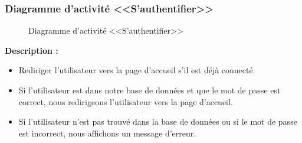 \documentclass[12pt]{report}
\begin{document}
\newpage

\subsubsection{Diagramme d'activité <<S'authentifier>>}

\begin{figure}[h]
\centering
    \centerline{}
    \caption{Diagramme d'activité <<S'authentifier>>}
\end{figure}

\textbf{Description :}

\begin{itemize}
    \item Rediriger l’utilisateur vers la page d’accueil s’il est déjà connecté.
    \item Si l’utilisateur est dans notre base de données et que le mot de passe est correct, nous redirigeons l’utilisateur vers la page d’accueil.
    \item Si l’utilisateur n’est pas trouvé dans la base de données ou si le mot de passe est incorrect, nous affichons un message d’erreur.
\end{itemize}
\end{document}

